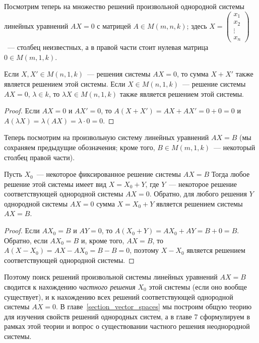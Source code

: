 Посмотрим теперь на множество решений произвольной однородной системы
линейных уравнений $AX=0$ с матрицей $A\in M(m,n,k)$; здесь
$X=\begin{pmatrix}x_1\\x_2\\\vdots\\x_n\end{pmatrix}$~--- столбец
неизвестных, а в правой части стоит нулевая матрица $0\in M(m,1,k)$.

\begin{proposition}
Если $X, X'\in M(n,1,k)$~--- решения системы $AX=0$, то сумма
  $X+X'$ также является решением этой системы.
Если $X\in M(n,1,k)$~--- решение системы $AX=0$, $\lambda\in k$,
  то $\lambda X\in M(n,1,k)$ также является решением этой системы.
\end{proposition}
\begin{proof}
Если $AX=0$ и $AX'=0$, то $A(X+X')=AX+AX'=0+0=0$ и
$A(\lambda X)=\lambda(AX)=\lambda\cdot 0=0$.
\end{proof}

Теперь посмотрим на произвольную систему линейных уравнений $AX=B$
(мы сохраняем предыдущие обозначения; кроме того, $B\in M(m,1,k)$~---
некоторый столбец правой части).
\begin{proposition}\label{prop_structure_of_solutions_linear_system}
Пусть $X_0$~--- некоторое фиксированное решение системы $AX=B$
Тогда любое решение этой системы
имеет вид $X = X_0 + Y$, где $Y$~--- некоторое решение соответствующей
однородной системы $AX=0$. Обратно, для любого решения $Y$ однородной
системы $AX=0$ сумма $X = X_0+Y$ является решением системы $AX=B$.
\end{proposition}
\begin{proof}
Если $AX_0=B$ и $AY=0$, то $A(X_0+Y)=AX_0+AY=B+0=B$. Обратно, если
$AX_0=B$ и, кроме того, $AX=B$, то $A(X-X_0)=AX-AX_0=B-B=0$, поэтому
$X-X_0$ является решением соответствующей однородной системы.
\end{proof}

Поэтому поиск решений произвольной системы линейных уравнений $AX=B$
сводится к нахождению {\em частного решения} $X_0$ этой системы (если
оно вообще существует), и к
нахождению всех решений соответствующей однородной системы $AX=0$.
В главе~\ref{section_vector_spaces} мы построим общую теорию для
изучения свойств решений однородных систем, а в главе 7 сформулируем
в рамках этой теории и вопрос о существовании частного решения
неоднородной
системы.
